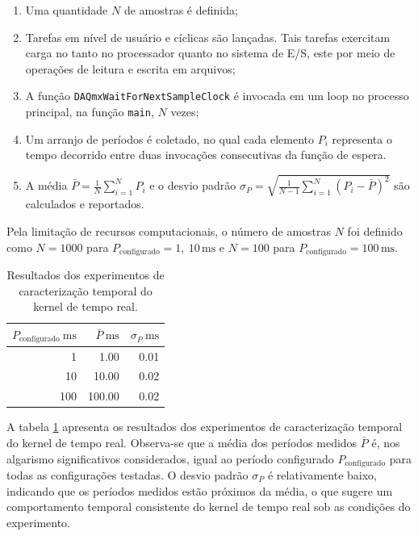 \documentclass[conference,harvard,brazil,english]{sbatex}
\begin{document}
\begin{enumerate}
    \item Uma quantidade $N$ de amostras é definida;
    \item Tarefas em nível de usuário e cíclicas são lançadas. Tais tarefas exercitam carga no tanto no processador quanto no sistema de E/S, este por meio de operações de leitura e escrita em arquivos;
    \item A função \texttt{DAQmxWaitForNextSampleClock} é invocada em um loop no processo principal, na função \texttt{main}, $N$ vezes;
    \item Um arranjo de períodos é coletado, no qual cada elemento $P_i$ representa o tempo decorrido entre duas invocações consecutivas da função de espera.
    \item A média $\bar{P} = \frac{1}{N} \sum_{i=1}^N P_i$ e o desvio padrão $\sigma_P = \sqrt{\frac{1}{N - 1} \sum_{i=1}^N (P_i - \bar{P})^2}$ são calculados e reportados.
\end{enumerate}

Pela limitação de recursos computacionais, o número de amostras $N$ foi definido como $N = 1000$ para $P_\text{configurado} = 1,\ 10\, \text{ms}$ e $N = 100$ para $P_\text{configurado} = 100\,\text{ms}$.

\begin{table}[H]
    \centering
    \begin{tabular}{r r r}
        \hline
        $P_\text{configurado}\ \text{ms}$ & $\bar{P}\ \text{ms}$ & $\sigma_P\ \text{ms}$ \\
        \hline
        1                                 & 1.00                 & 0.01                  \\
        10                                & 10.00                & 0.02                  \\
        100                               & 100.00               & 0.02                  \\
        \hline
    \end{tabular}
    \caption{Resultados dos experimentos de caracterização temporal do kernel de tempo real.}
    \label{tab:resultados_temporais}
\end{table}

A tabela \ref{tab:resultados_temporais} apresenta os resultados dos experimentos de caracterização temporal do kernel de tempo real. Observa-se que a média dos períodos medidos $\bar{P}$ é, nos algarismo significativos considerados, igual ao período configurado $P_\text{configurado}$ para todas as configurações testadas. O desvio padrão $\sigma_P$ é relativamente baixo, indicando que os períodos medidos estão próximos da média, o que sugere um comportamento temporal consistente do kernel de tempo real sob as condições do experimento.
\end{document}
